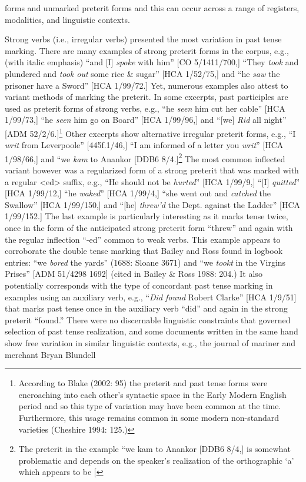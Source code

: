 \begin{styleStandard}
forms and unmarked preterit forms and this can occur across a range of registers, modalities, and linguistic contexts. 
\end{styleStandard}

\begin{styleStandard}
Strong verbs (i.e., irregular verbs) presented the most variation in past tense marking. There are many examples of strong preterit forms in the corpus, e.g., (with italic emphasis) “and [I] \textit{spoke} with him” [CO 5/1411/700,] “They \textit{took} and plundered and \textit{took out} some rice \& sugar” [HCA 1/52/75,] and “he \textit{saw} the prisoner have a Sword” [HCA 1/99/72.] Yet, numerous examples also attest to variant methods of marking the preterit. In some excerpts, past participles are used as preterit forms of strong verbs, e.g., “he \textit{seen} him cut her cable” [HCA 1/99/73,] “he \textit{seen} him go on Board” [HCA 1/99/96,] and “[we]\textit{ Rid} all night” [ADM 52/2/6.]\footnote{ According to Blake (2002: 95) the preterit and past tense forms were encroaching into each other’s syntactic space in the Early Modern English period and so this type of variation may have been common at the time. Furthermore, this usage remains common in some modern non-standard varieties (Cheshire 1994: 125.)} Other excerpts show alternative irregular preterit forms, e.g., “I \textit{writ} from\textit{ }Leverpoole” [445f.1/46,] “I am informed of a letter you \textit{writ}” [HCA 1/98/66,] and “we \textit{kam} to Anankor{\textquotedbl} [DDB6 8/4.]\footnote{ The preterit in the example “we kam to Anankor{\textquotedbl} [DDB6 8/4,] is somewhat problematic and depends on the speaker’s realization of the orthographic ‘a’ which appears to be [\textcyrillic{ӕ] but could just have likely been realized as the diphthong [a\textlatin{[26A?]}] or another allophonic variant acceptable in contemporary usage. }} The most common inflected variant however was a regularized form of a strong preterit that was marked with a regular {\textless}ed{\textgreater} suffix, e.g., “He should not be \textit{hurted}” [HCA 1/99/9,] “[I] \textit{quitted}” [HCA 1/99/12,] “he \textit{waked}” [HCA 1/99/4,] “she went out and\textit{ catched} the Swallow” [HCA 1/99/150,] and “[he] \textit{threw’d} the Dept. against the Ladder” [HCA 1/99/152.] The last example is particularly interesting as it marks tense twice, once in the form of the anticipated strong preterit form “threw” and again with the regular inflection “-ed” common to weak verbs. This example appears to corroborate the double tense marking that Bailey and Ross found in logbook entries: “we \textit{bored} the yards” (1688: Sloane 3671) and “we \textit{tookt} in the Virgins Prises” [ADM 51/4298 1692] (cited in Bailey \& Ross 1988: 204.) It also potentially corresponds with the type of concordant past tense marking in examples using an auxiliary verb, e.g., “\textit{Did found} Robert Clarke” [HCA 1/9/51] that marks past tense once in the auxiliary verb “did” and again in the strong preterit “found.” There were no discernable linguistic constraints that governed selection of past tense realization, and some documents written in the same hand show free variation in similar linguistic contexts, e.g., the journal of mariner and merchant Bryan Blundell 
\end{styleStandard}
